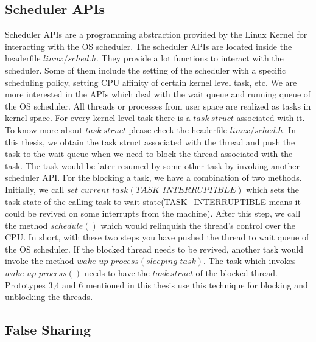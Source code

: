  


\subsection{Scheduler APIs}

Scheduler APIs are a programming abstraction provided by the Linux Kernel for interacting with the OS scheduler. 
The scheduler APIs are located inside the headerfile $linux/sched.h$. 
They provide a lot functions to interact with the scheduler. 
Some of them include the setting of the scheduler with a specific scheduling policy, setting CPU affinity of certain kernel level task, etc. 
We are more interested in the APIs which deal with the wait queue and running queue of the OS scheduler. 
All threads or processes from user space are realized as tasks in kernel space. 
For every kernel level task there is a $task\ struct$ associated with it. 
To know more about $task\ struct$ please check the headerfile $linux/sched.h$. 
In this thesis, we obtain the task struct associated with the thread and push the task to the wait queue when we need to block the thread associated with the task. 
The task would be later resumed by some other task by invoking another scheduler API. 
For the blocking a task, we have a combination of two methods. 
Initially, we call $set\_current\_task(TASK\_INTERRUPTIBLE)$ which sets the task state of the calling task to wait state(TASK\_INTERRUPTIBLE means it could be revived on some interrupts from the machine). 
After this step, we call the method $schedule()$ which would relinquish the thread's control over the CPU. 
In short, with these two steps you have pushed the thread to wait queue of the OS scheduler. 
If the blocked thread needs to be revived, another task would invoke the method $wake\_up\_process(sleeping\_task)$. 
The task which invokes $wake\_up\_process()$ needs to have the $task\ struct$ of the blocked thread. 
Prototypes 3,4 and 6 mentioned in this thesis use this technique for blocking and unblocking the threads. 
 

\subsection{False Sharing}

